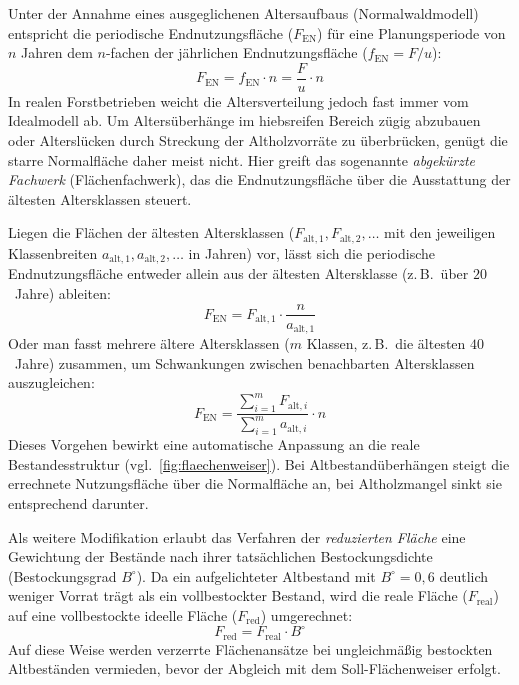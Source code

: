 \documentclass[twocolumn, paper=a4, fontsize=10pt]{scrartcl}
\begin{document}
Unter der Annahme eines ausgeglichenen Altersaufbaus (Normalwaldmodell) entspricht die periodische Endnutzungsfläche ($F_{\text{EN}}$) für eine Planungsperiode von $n$ Jahren dem $n$-fachen der jährlichen Endnutzungsfläche ($f_{\text{EN}} = F / u$):
\begin{equation}
    \label{eq:fen_normal}
    F_{\text{EN}} = f_{\text{EN}} \cdot n = \frac{F}{u} \cdot n
\end{equation}
In realen Forstbetrieben weicht die Altersverteilung jedoch fast immer vom Idealmodell ab. Um Altersüberhänge im hiebsreifen Bereich zügig abzubauen oder Alterslücken durch Streckung der Altholzvorräte zu überbrücken, genügt die starre Normalfläche daher meist nicht. Hier greift das sogenannte \emph{abgekürzte Fachwerk} (Flächenfachwerk), das die Endnutzungsfläche über die Ausstattung der ältesten Altersklassen steuert.

Liegen die Flächen der ältesten Altersklassen ($F_{\text{alt},1}, F_{\text{alt},2}, \dots$ mit den jeweiligen Klassenbreiten $a_{\text{alt},1}, a_{\text{alt},2}, \dots$ in Jahren) vor, lässt sich die periodische Endnutzungsfläche entweder allein aus der ältesten Altersklasse (z.\,B.\ über $20$~Jahre) ableiten:
\begin{equation}
    \label{eq:fen_fachwerk1}
    F_{\text{EN}} = F_{\text{alt},1} \cdot \frac{n}{a_{\text{alt},1}}
\end{equation}
Oder man fasst mehrere ältere Altersklassen ($m$ Klassen, z.\,B.\ die ältesten $40$~Jahre) zusammen, um Schwankungen zwischen benachbarten Altersklassen auszugleichen:
\begin{equation}
    \label{eq:fen_fachwerk2}
    F_{\text{EN}} = \frac{\sum_{i=1}^{m} F_{\text{alt},i}}{\sum_{i=1}^{m} a_{\text{alt},i}} \cdot n
\end{equation}
Dieses Vorgehen bewirkt eine automatische Anpassung an die reale Bestandesstruktur (vgl.\ \cref{fig:flaechenweiser}). Bei Altbestandüberhängen steigt die errechnete Nutzungsfläche über die Normalfläche an, bei Altholzmangel sinkt sie entsprechend darunter.

Als weitere Modifikation erlaubt das Verfahren der \emph{reduzierten Fläche} eine Gewichtung der Bestände nach ihrer tatsächlichen Bestockungsdichte (Bestockungsgrad $B^\circ$). Da ein aufgelichteter Altbestand mit $B^\circ = 0{,}6$ deutlich weniger Vorrat trägt als ein vollbestockter Bestand, wird die reale Fläche ($F_{\text{real}}$) auf eine vollbestockte ideelle Fläche ($F_{\text{red}}$) umgerechnet:
\begin{equation}
    \label{eq:fred}
    F_{\text{red}} = F_{\text{real}} \cdot B^\circ
\end{equation}
Auf diese Weise werden verzerrte Flächenansätze bei ungleichmäßig bestockten Altbeständen vermieden, bevor der Abgleich mit dem Soll-Flächenweiser erfolgt.
\end{document}
